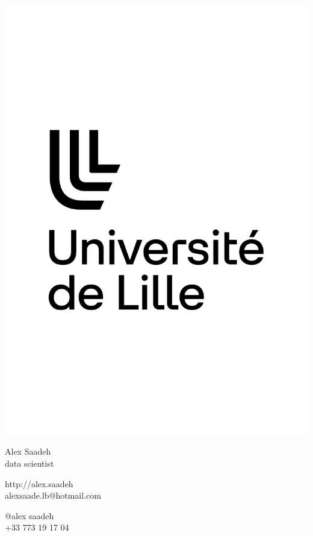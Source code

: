 \documentclass{article}
\begin{document}
\centering \includegraphics[width=.25\linewidth]{logo}\\[5pt]
\parbox{2in}{\Large \centering Alex Saadeh\\[1pt]
\normalsize data scientist}

\vfill
\raggedright
\begin{multicols}{2}
http://alex.saadeh\\
alexsaade.lb@hotmail.com

\columnbreak
\raggedleft
@alex saadeh\\
+33 773 19 17 04%
\end{multicols}%
\end{document}

